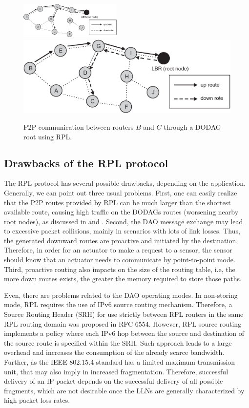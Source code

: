 \documentclass[final,authoryear,3p,twocolumn]{elsarticle}
\begin{document}
\begin{figure}[h!tb]
\centering
\ifdefined\TWOCOL
\includegraphics[width=0.45\textwidth]{figures/RPL_DAO}
\else
\includegraphics[width=1\textwidth]{RPL_DAO}
\fi
\caption{P2P communication between routers $B$ and $C$ through a DODAG root using RPL.}
\label{RPL_DAO}
\end{figure}

\subsection{Drawbacks of the RPL protocol}

The RPL protocol has several possible drawbacks, depending on the application. Generally, we can point out three usual problems. First, one can easily realize that the P2P routes provided by RPL can be much larger than the shortest available route, causing high traffic on the DODAGs routes (worsening nearby root nodes), as discussed in \citep{P2P_analysis_2010} and \citep{P2P-RPL_2011}. Second, the DAO message exchange may lead to excessive packet collisions, mainly in scenarios with lots of link losses. Thus, the generated downward routes are proactive and initiated by the destination. Therefore, in order for an actuator to make a request to a sensor, the sensor should know that an actuator needs to communicate by point-to-point mode. Third, proactive routing also impacts on the size of the routing table, i.e, the more down routes exists, the greater the memory required to store those paths.

Even, there are problems related to the DAO operating modes. In non-storing mode, RPL requires the use of IPv6 source routing mechanism. Therefore, a Source Routing Header (SRH) for use strictly between RPL routers in the same RPL routing domain was proposed in RFC 6554. However, RPL source routing implements a policy where each IPv6 hop between the source and destination of the source route is specified within the SRH. Such approach leads to a large overhead and increases the consumption of the already scarce bandwidth. Further, as the IEEE 802.15.4 standard has a limited maximum transmission unit, that may also imply in increased fragmentation. Therefore, successful delivery of an IP packet depends on the successful delivery of all possible fragments, which are not desirable once the LLNs are generally characterized by high packet loss rates.
\end{document}
